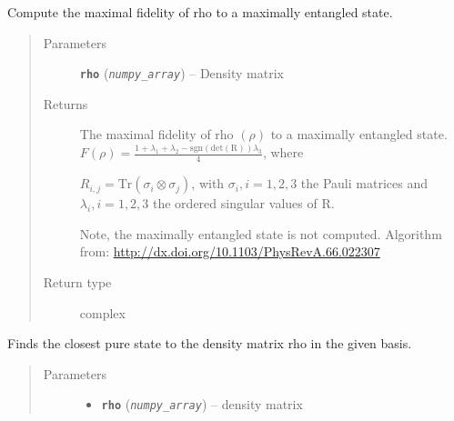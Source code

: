 \documentclass[letterpaper,10pt,english]{sphinxmanual}
\begin{document}
\begin{fulllineitems}
\begin{fulllineitems}
\begin{quote}
\begin{description}
\end{description}\end{quote}

\end{fulllineitems}


\begin{fulllineitems}
\label{modules:Tomography.DensityMatrix.fidelity_max}
Compute the maximal fidelity of rho to a maximally entangled state.
\begin{quote}\begin{description}
\item[{Parameters}] \leavevmode
\textbf{\texttt{rho}} (\emph{\texttt{numpy\_array}}) -- Density matrix

\item[{Returns}] \leavevmode

The maximal fidelity of rho \((\rho)\) to a maximally entangled state.
\(F(\rho)=\frac{1+\lambda_1+\lambda_2-\mathrm{sgn}(\mathrm{det(R)})\lambda_3}{4}\), where

\(R_{i,j}=\mathrm{Tr}(\sigma_i \otimes \sigma_j)\), with
\(\sigma_i, {i=1,2,3}\) the Pauli matrices and
\(\lambda_i, {i=1,2,3}\) the ordered singular values of R.

Note, the maximally entangled state is not computed.
Algorithm from: \url{http://dx.doi.org/10.1103/PhysRevA.66.022307}


\item[{Return type}] \leavevmode
complex

\end{description}\end{quote}

\end{fulllineitems}


\begin{fulllineitems}
\label{modules:Tomography.DensityMatrix.find_closest_pure_state}
Finds the closest pure state to the density matrix rho in the given basis.
\begin{quote}\begin{description}
\item[{Parameters}] \leavevmode\begin{itemize}
\item {} 
\textbf{\texttt{rho}} (\emph{\texttt{numpy\_array}}) -- density matrix


\end{itemize}
\end{description}
\end{quote}
\end{fulllineitems}
\end{fulllineitems}
\end{document}
